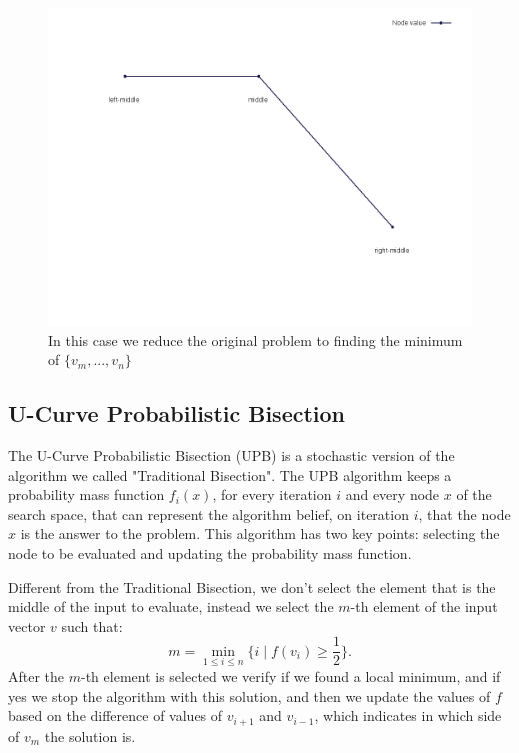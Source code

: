\documentclass[12pt]{article}
\begin{document}
    \begin{figure}[H]
        \centering
        \includegraphics[scale=.35]{mid_case9}
        \caption{In this case we reduce the original problem to finding the minimum of $\{v_m, ..., v_n\}$}
    \end{figure}

\subsection{U-Curve Probabilistic Bisection}
The U-Curve Probabilistic Bisection (UPB) is a stochastic version of the algorithm we called "Traditional Bisection". The UPB algorithm keeps a probability mass function $f_i (x)$, for every iteration $i$ and every node $x$ of the search space, that can represent the algorithm belief, on iteration $i$, that the node $x$ is the answer to the problem. This algorithm has two key points: selecting the node to be evaluated and updating the probability mass function.

Different from the Traditional Bisection, we don't select the element that is the middle of the input to evaluate, instead we select the $m$-th element of the input vector $v$ such that:
\begin{equation*}
    m = \min\limits_{1 \leq i \leq n} \{i \mid f (v_i) \geq \frac{1}{2}\}.
\end{equation*}
After the $m$-th element is selected we verify if we found a local minimum, and if yes we stop the algorithm with this solution, and then we update the values of $f$ based on the difference of values of $v_{i + 1}$ and $v_{i - 1}$, which indicates in which side of $v_m$ the solution is.
\end{document}

